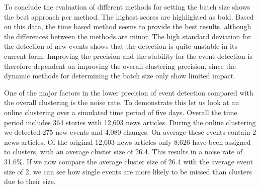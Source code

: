 To conclude the evaluation of different methods for setting the batch size 
shows the best approach per method.
The highest scores are highlighted as bold.
Based on this data, the time based method seems to provide the best results,
although the differences between the methods are minor.
The high standard deviation for the detection of new events shows
that the detection is quite unstable in its current form.
Improving the precision and the stability for the event detection
is therefore dependent on improving the overall clustering precision,
since the dynamic methods for determining the batch size only show limited impact.

\begin{table}[h]
    \centering
    \caption{Final scores obtained by each method for setting the batch size.}
    \label{tab:batch_size_methods}
\end{table}

One of the major factors in the lower precision of event detection
compared with the overall clustering is the noise rate.
To demonstrate this let us look at an online clustering over a simulated time period of five days.
Overall the time period includes 364 stories with 12,603 news articles.
During the online clustering we detected 275 new events and 4,080 changes.
On average these events contain 2 news articles.
Of the original 12,603 news articles only 8,626 have been assigned to clusters,
with an average cluster size of 26.4.
This results in a noise rate of 31.6\%.
If we now compare the average cluster size of 26.4 with the average event size of 2,
we can see how single events are more likely to be missed than clusters due to their size.

